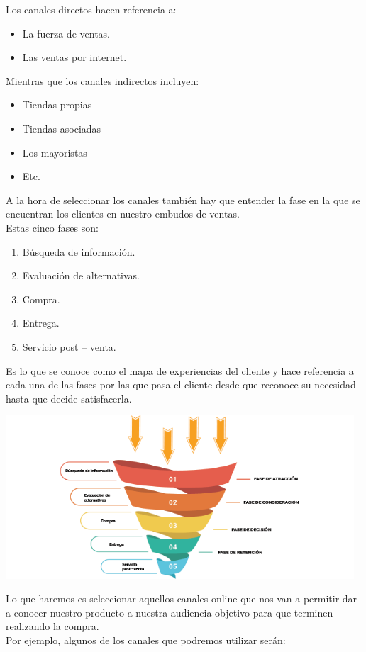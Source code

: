 \documentclass[preprint,12pt]{elsarticle}
\begin{document}
Los canales directos hacen referencia a:
\begin{itemize}
\item La fuerza de ventas.
\item Las ventas por internet.
\end{itemize}

Mientras que los canales indirectos incluyen:
\begin{itemize}
\item Tiendas propias
\item Tiendas asociadas
\item Los mayoristas
\item Etc.
\end{itemize}
A la hora de seleccionar los canales también hay que entender la fase en la que se encuentran los clientes en nuestro embudos de ventas.\\
Estas cinco fases son:
\begin{enumerate}[1.]
\item  Búsqueda de información.
\item  Evaluación de alternativas.
\item  Compra.
\item  Entrega.
\item  Servicio post – venta.
\end{enumerate}
Es lo que se conoce como el mapa de experiencias del cliente y hace referencia a cada una de las fases por las que pasa el cliente desde que reconoce su necesidad hasta que decide satisfacerla.\\
	\begin{center}
	\includegraphics[width=13cm]{./Imagenes/canvas2}
	\end{center}
Lo que haremos es seleccionar aquellos canales online que nos van a permitir dar a conocer nuestro producto a nuestra audiencia objetivo para que terminen realizando la compra.\\
Por ejemplo, algunos de los canales que podremos utilizar serán:\\
\end{document}
